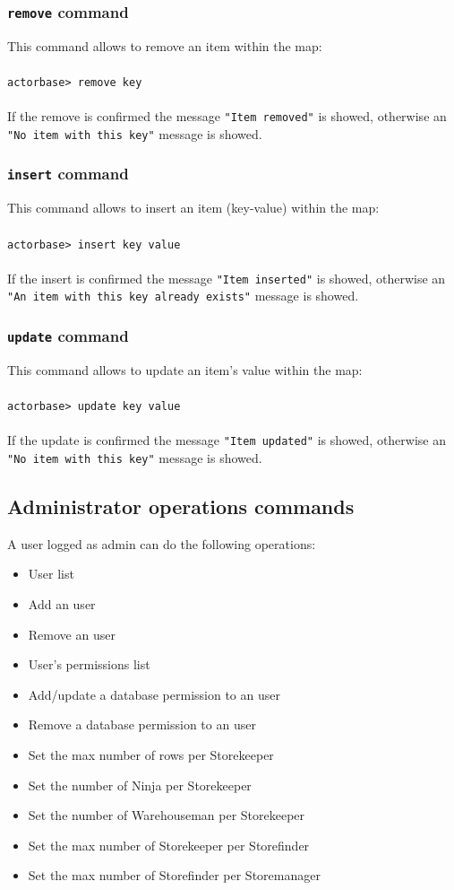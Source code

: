 \documentclass[a4paper]{article}
\begin{document}
	\subsubsection{\texttt{remove} command}
	This command allows to remove an item within the map:
	\\ \\
	\texttt{actorbase>	remove key}
	\\ \\
	If the remove is confirmed the message \texttt{"Item removed"} is showed, otherwise an \texttt{"No item with this key"} message is showed.

	\subsubsection{\texttt{insert} command}
	This command allows to insert an item (key-value) within the map:
	\\ \\
	\texttt{actorbase>	insert key value}
	\\ \\
	If the insert is confirmed the message \texttt{"Item inserted"} is showed, otherwise an \texttt{"An item with this key already exists"} message is showed.
	
	\subsubsection{\texttt{update} command}
	This command allows to update an item's value within the map:
	\\ \\
	\texttt{actorbase>	update key value}
	\\ \\
	If the update is confirmed the message \texttt{"Item updated"} is showed, otherwise an \texttt{"No item with this key"} message is showed.
	
	\subsection{Administrator operations commands}
	A user logged as admin can do the following operations:
	\begin{itemize}
		\item User list
		\item Add an user
		\item Remove an user
		\item User's permissions list
		\item Add/update a database permission to an user
		\item Remove a database permission to an user
		\item Set the max number of rows per Storekeeper
		\item Set the number of Ninja per Storekeeper
		\item Set the number of Warehouseman per Storekeeper
		\item Set the max number of Storekeeper per Storefinder
		\item Set the max number of Storefinder per Storemanager
	\end{itemize}
\end{document}
